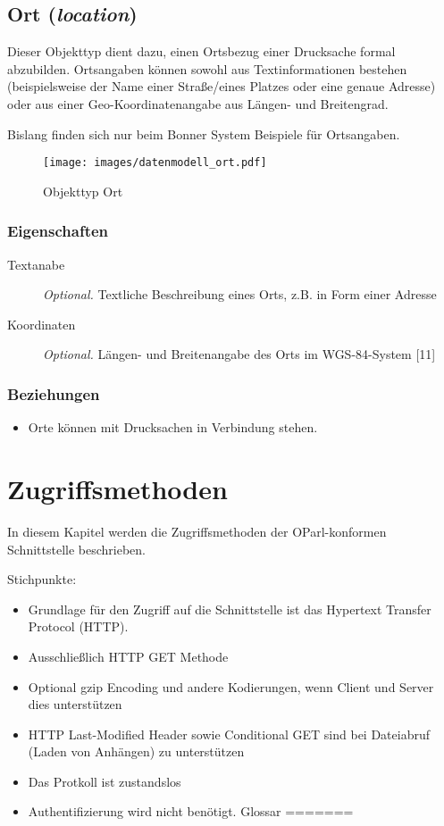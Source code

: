 \documentclass[,a4paper]{article}
\makeatletter
\def\maxwidth{\ifdim\Gin@nat@width>\linewidth\linewidth
\else\Gin@nat@width\fi}
\let\Oldincludegraphics\includegraphics
\renewcommand{\includegraphics}[1]{\Oldincludegraphics[width=\maxwidth]{#1}}
\makeatother
\begin{document}
\subsection{Ort (\emph{location})}

Dieser Objekttyp dient dazu, einen Ortsbezug einer Drucksache formal
abzubilden. Ortsangaben können sowohl aus Textinformationen bestehen
(beispielsweise der Name einer Straße/eines Platzes oder eine genaue
Adresse) oder aus einer Geo-Koordinatenangabe aus Längen- und
Breitengrad.

Bislang finden sich nur beim Bonner System Beispiele für Ortsangaben.

\begin{figure}[htbp]
\centering
\texttt{[image: images/datenmodell\_ort.pdf]}
\caption{Objekttyp Ort}
\end{figure}

\subsubsection{Eigenschaften}

\begin{description}
\item[Textanabe]
\emph{Optional.} Textliche Beschreibung eines Orts, z.B. in Form einer
Adresse
\item[Koordinaten]
\emph{Optional.} Längen- und Breitenangabe des Orts im WGS-84-System
{[}11{]}
\end{description}

\subsubsection{Beziehungen}

\begin{itemize}
\item
  Orte können mit Drucksachen in Verbindung stehen.
\end{itemize}

\section{Zugriffsmethoden}

In diesem Kapitel werden die Zugriffsmethoden der OParl-konformen
Schnittstelle beschrieben.

Stichpunkte:

\begin{itemize}
\item
  Grundlage für den Zugriff auf die Schnittstelle ist das Hypertext
  Transfer Protocol (HTTP).
\item
  Ausschließlich HTTP GET Methode
\item
  Optional gzip Encoding und andere Kodierungen, wenn Client und Server
  dies unterstützen
\item
  HTTP Last-Modified Header sowie Conditional GET sind bei Dateiabruf
  (Laden von Anhängen) zu unterstützen
\item
  Das Protkoll ist zustandslos
\item
  Authentifizierung wird nicht benötigt. Glossar =======
\end{itemize}
\end{document}
